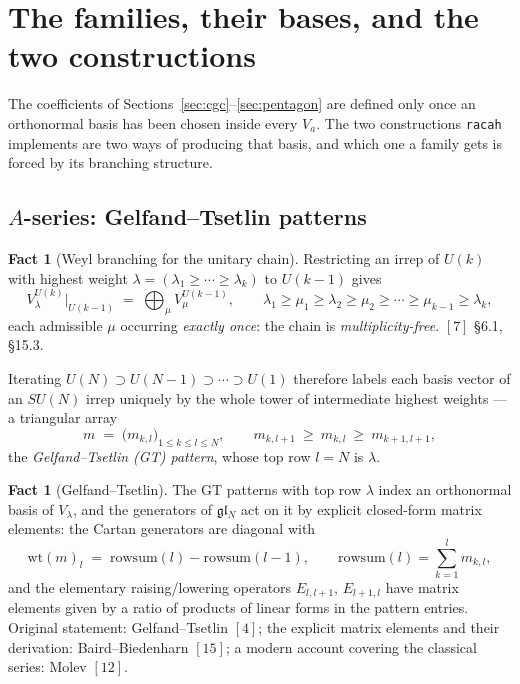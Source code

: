 \documentclass[11pt,a4paper]{article}
\theoremstyle{plain}
\theoremstyle{definition}
\newtheorem{fact}[theorem]{Fact}
\newcommand{\g}{\mathfrak{g}}
\newcommand{\code}[1]{\texttt{#1}}
\begin{document}
\section{The families, their bases, and the two constructions}
\label{sec:constructions}

The coefficients of Sections~\ref{sec:cgc}--\ref{sec:pentagon} are defined only
once an orthonormal basis has been chosen inside every $V_a$. The two
constructions \code{racah} implements are two ways of producing that basis, and
which one a family gets is forced by its branching structure.

\subsection{$A$-series: Gelfand--Tsetlin patterns}
\label{sec:gt}

\begin{fact}[Weyl branching for the unitary chain]\label{fact:branch}
Restricting an irrep of $U(k)$ with highest weight
$\lambda=(\lambda_1\ge\cdots\ge\lambda_k)$ to $U(k-1)$ gives
\[
  V^{U(k)}_\lambda\big|_{U(k-1)} \;=\; \bigoplus_{\mu} V^{U(k-1)}_\mu,
  \qquad
  \lambda_1 \ge \mu_1 \ge \lambda_2 \ge \mu_2 \ge \cdots \ge \mu_{k-1} \ge \lambda_k,
\]
each admissible $\mu$ occurring \emph{exactly once}: the chain is
\emph{multiplicity-free}. $[7]$ \S6.1, \S15.3.
\end{fact}

Iterating $U(N)\supset U(N-1)\supset\cdots\supset U(1)$ therefore labels each
basis vector of an $SU(N)$ irrep uniquely by the whole tower of intermediate
highest weights --- a triangular array
\[
  m \;=\;
  \bigl( m_{k,l} \bigr)_{1\le k\le l\le N},
  \qquad
  m_{k,l+1} \ \ge\ m_{k,l} \ \ge\ m_{k+1,l+1},
\]
the \emph{Gelfand--Tsetlin (GT) pattern}, whose top row $l=N$ is $\lambda$.

\begin{fact}[Gelfand--Tsetlin]\label{fact:gt}
The GT patterns with top row $\lambda$ index an orthonormal basis of
$V_\lambda$, and the generators of $\g\mathfrak{l}_N$ act on it by explicit
closed-form matrix elements: the Cartan generators are diagonal with
\[
  \mathrm{wt}(m)_l \;=\; \mathrm{rowsum}(l) - \mathrm{rowsum}(l-1),
  \qquad \mathrm{rowsum}(l) = \sum_{k=1}^{l} m_{k,l},
\]
and the elementary raising/lowering operators $E_{l,l+1}$, $E_{l+1,l}$ have
matrix elements given by a ratio of products of linear forms in the pattern
entries. Original statement: Gelfand--Tsetlin $[4]$; the explicit matrix
elements and their derivation: Baird--Biedenharn $[15]$; a modern account
covering the classical series: Molev $[12]$.
\end{fact}
\end{document}
